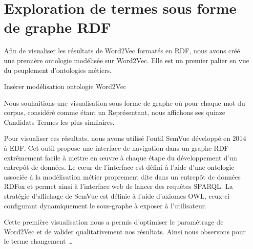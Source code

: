 \section{Exploration de termes sous forme de graphe RDF}
Afin de visualiser les résultats de Word2Vec formatés en RDF, nous avons créé une première ontologie modélisée sur Word2Vec. Elle est un premier palier en vue du peuplement d'ontologies métiers.

	Insérer modélisation ontologie Word2Vec

Nous souhaitions une visualisation sous forme de graphe où pour chaque mot du corpus, considéré comme étant un Représentant, nous affichons ses quinze Candidats Termes les plus similaires.

Pour visualiser ces résultats, nous avons utilisé l'outil SemVue développé en 2014 à EDF. Cet outil propose une interface de navigation dans un graphe RDF extrêmement facile à mettre en œuvre à chaque étape du développement d’un entrepôt de données. Le cœur de l’interface est défini à l’aide d’une ontologie associée à la modélisation métier proprement dite dans un entrepôt de données RDFox \cite{mnpho14parallel-materialisation-RDFox} et permet ainsi à l’interface web de lancer des requêtes SPARQL. La stratégie d’affichage de SemVue est définie à l’aide d’axiomes OWL, ceux-ci configurant dynamiquement le sous-graphe à exposer à l’utilisateur.

Cette première visualisation nous a permis d'optimiser le paramétrage de Word2Vec et de valider qualitativement nos résultats. Ainsi nous observons pour le terme changement …
